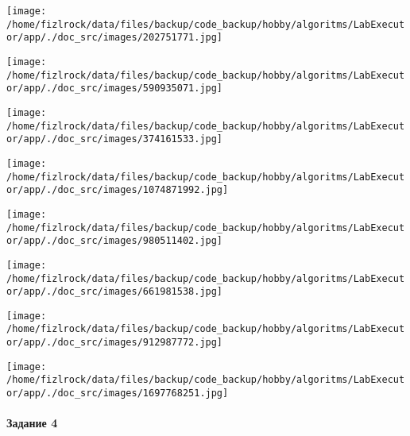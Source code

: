 \documentclass[a4paper, 12pt]{article}
\begin{document}
\texttt{[image: /home/fizlrock/data/files/backup/code\_backup/hobby/algoritms/LabExecutor/app/./doc\_src/images/202751771.jpg]}

\texttt{[image: /home/fizlrock/data/files/backup/code\_backup/hobby/algoritms/LabExecutor/app/./doc\_src/images/590935071.jpg]}

\texttt{[image: /home/fizlrock/data/files/backup/code\_backup/hobby/algoritms/LabExecutor/app/./doc\_src/images/374161533.jpg]}

\texttt{[image: /home/fizlrock/data/files/backup/code\_backup/hobby/algoritms/LabExecutor/app/./doc\_src/images/1074871992.jpg]}

\texttt{[image: /home/fizlrock/data/files/backup/code\_backup/hobby/algoritms/LabExecutor/app/./doc\_src/images/980511402.jpg]}

\texttt{[image: /home/fizlrock/data/files/backup/code\_backup/hobby/algoritms/LabExecutor/app/./doc\_src/images/661981538.jpg]}

\texttt{[image: /home/fizlrock/data/files/backup/code\_backup/hobby/algoritms/LabExecutor/app/./doc\_src/images/912987772.jpg]}

\texttt{[image: /home/fizlrock/data/files/backup/code\_backup/hobby/algoritms/LabExecutor/app/./doc\_src/images/1697768251.jpg]}
\pagebreak
\paragraph{Задание 4}
\end{document}
